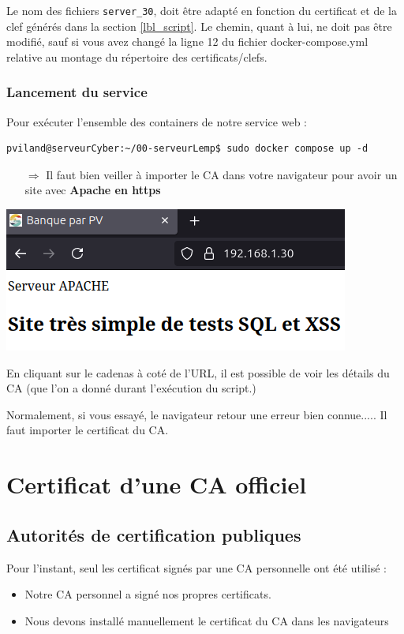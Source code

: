 \documentclass[french, 12pt]{article}%
\newcommand{\itemE}{\item[$\bullet$]}
\begin{document}
Le nom des fichiers \verb?server_30?, doit être adapté en fonction du certificat et de la clef générés dans la section \ref{lbl_script}. Le chemin, quant à lui, ne doit pas être modifié, sauf si vous avez changé la ligne 12 du fichier docker-compose.yml relative au montage du répertoire des certificats/clefs.


\subsubsection{Lancement du service}

Pour exécuter l'ensemble des containers de notre service web : 
\begin{lstlisting}[style=commande]
pviland@serveurCyber:~/00-serveurLemp$ sudo docker compose up -d
\end{lstlisting}


\begin{itemize}
\item[$\Rightarrow$] Il faut bien veiller à importer le CA dans votre navigateur pour avoir un site avec \textbf{Apache en https}
\end{itemize}


\begin{center}
\includegraphics[scale=0.7]{./ressource/apacheHttps}
\end{center}

En cliquant sur le cadenas à coté de l'URL, il est possible de voir les détails du CA (que l'on a donné durant l'exécution du script.)



Normalement, si vous essayé, le navigateur retour une erreur bien connue..... Il faut importer le certificat du CA.



\section{Certificat d'une CA officiel}

\subsection{Autorités de certification publiques }
Pour l'instant, seul les certificat signés par une CA personnelle ont été utilisé : 
\begin{itemize}
\itemE Notre CA personnel a signé nos propres certificats. 
\itemE Nous devons installé manuellement le certificat du CA dans les navigateurs 
\end{itemize} 
\end{document}
